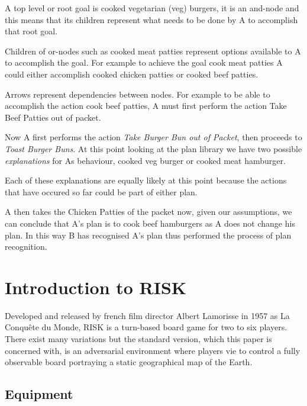 \documentclass[parskip]{cs4rep}
\begin{document}
A top level or root goal is cooked vegetarian (veg) burgers, it is an and-node and this means that its children represent what needs to be done by A to accomplish that root goal. 

Children of or-nodes such as cooked meat patties represent options available to A to accomplish the goal. For example to achieve the goal cook meat patties A could either accomplish cooked chicken patties or cooked beef patties.

Arrows represent dependencies between nodes. For example to be able to accomplish the action cook beef patties, A must first perform the action Take Beef Patties out of packet.

Now A first performs the action \textit{Take Burger Bun out of Packet}, then proceeds to \textit{Toast Burger Buns}. At this point looking at the plan library we have two possible \textit{explanations} for As behaviour, cooked veg burger or cooked meat hamburger.

Each of these explanations are equally likely at this point because the actions that have occured so far could be part of either plan.

A then takes the Chicken Patties of the packet now, given our assumptions, we can conclude that A's plan is to cook beef hamburgers as A does not change his plan. In this way B has recognised A's plan thus performed the process of plan recognition.

\newpage

\section{Introduction to RISK}

Developed and released by french film director Albert Lamorisse in 1957 as La Conqu\^ete du Monde, RISK is a turn-based board game for two to six players. There exist many variations but the standard version, which this paper is concerned with, is an adversarial environment where players vie to control a fully observable board portraying a static geographical map of the Earth.

\subsection{Equipment}
\end{document}
